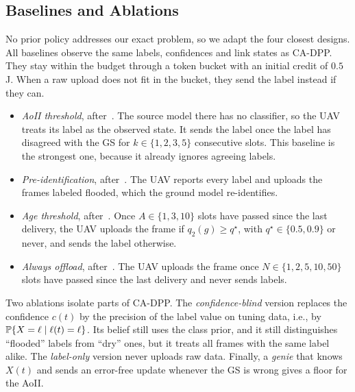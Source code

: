 \subsection{Baselines and Ablations}
No prior policy addresses our exact problem, so we adapt the four closest designs. All baselines observe the same labels, confidences and link states as CA-DPP. They stay within the budget through a token bucket with an initial credit of $0.5$\,J. When a raw upload does not fit in the bucket, they send the label instead if they can.
\begin{itemize}
\item \emph{AoII threshold}, after~\cite{zakeri2023aoiieh}. The source model there has no classifier, so the UAV treats its label as the observed state. It sends the label once the label has disagreed with the GS for $k\in\{1,2,3,5\}$ consecutive slots. This baseline is the strongest one, because it already ignores agreeing labels.
\item \emph{Pre-identification}, after~\cite{gan2025taoi}. The UAV reports every label and uploads the frames labeled flooded, which the ground model re-identifies.
\item \emph{Age threshold}, after~\cite{pehlivanoglu2026orbit}. Once $A\in\{1,3,10\}$ slots have passed since the last delivery, the UAV uploads the frame if $q_2(g)\ge q^\star$, with $q^\star\in\{0.5,0.9\}$ or never, and sends the label otherwise.
\item \emph{Always offload}, after~\cite{basnayaka2025aomi}. The UAV uploads the frame once $N\in\{1,2,5,10,50\}$ slots have passed since the last delivery and never sends labels.
\end{itemize}
Two ablations isolate parts of CA-DPP. The \emph{confidence-blind} version replaces the confidence $c(t)$ by the precision of the label value on tuning data, i.e., by $\mathbb{P}\{X=\ell\mid\ell(t)=\ell\}$. Its belief still uses the class prior, and it still distinguishes ``flooded'' labels from ``dry'' ones, but it treats all frames with the same label alike. The \emph{label-only} version never uploads raw data. Finally, a \emph{genie} that knows $X(t)$ and sends an error-free update whenever the GS is wrong gives a floor for the AoII.

